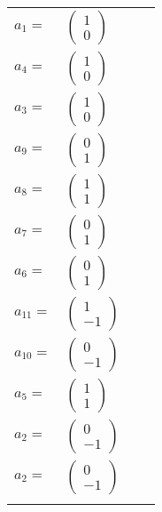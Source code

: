 \documentclass[1p]{elsarticle_modified}
\theoremstyle{definition}
\begin{document}
\begin{tabular}{m{7pt} m{180pt} m{7pt} m{180pt} }
\flushright $a_{1}=$&$\begin{pmatrix}1\\0\end{pmatrix}$ \\
\flushright $a_{4}=$&$\begin{pmatrix}1\\0\end{pmatrix}$ \\
\flushright $a_{3}=$&$\begin{pmatrix}1\\0\end{pmatrix}$ \\
\flushright $a_{9}=$&$\begin{pmatrix}0\\1\end{pmatrix}$ \\
\flushright $a_{8}=$&$\begin{pmatrix}1\\1\end{pmatrix}$ \\
\flushright $a_{7}=$&$\begin{pmatrix}0\\1\end{pmatrix}$ \\
\flushright $a_{6}=$&$\begin{pmatrix}0\\1\end{pmatrix}$ \\
\flushright $a_{11}=$&$\begin{pmatrix}1\\-1\end{pmatrix}$ \\
\flushright $a_{10}=$&$\begin{pmatrix}0\\-1\end{pmatrix}$ \\
\flushright $a_{5}=$&$\begin{pmatrix}1\\1\end{pmatrix}$ \\
\flushright $a_{2}=$&$\begin{pmatrix}0\\-1\end{pmatrix}$\\ \flushright $a_{2}=$&$\begin{pmatrix}0\\-1\end{pmatrix}$\\&\end{tabular}
\end{document}
